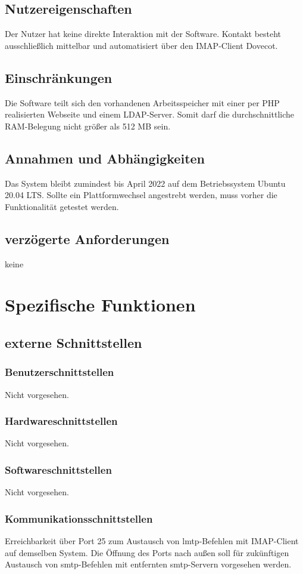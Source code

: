 \subsection{Nutzereigenschaften}
Der Nutzer hat keine direkte Interaktion mit der Software. Kontakt besteht ausschließlich mittelbar und automatisiert über den IMAP-Client Dovecot.
\subsection{Einschränkungen}
Die Software teilt sich den vorhandenen Arbeitsspeicher mit einer per PHP realisierten Webseite und einem LDAP-Server. Somit darf die durchschnittliche RAM-Belegung nicht größer als 512 MB sein.
\subsection{Annahmen und Abhängigkeiten}
Das System bleibt zumindest bis April 2022 auf dem Betriebssystem Ubuntu 20.04 LTS. Sollte ein Plattformwechsel angestrebt werden, muss vorher die Funktionalität getestet werden.
\subsection{verzögerte Anforderungen}
keine 
\section{Spezifische Funktionen}

\subsection{externe Schnittstellen}
\subsubsection*{Benutzerschnittstellen}
Nicht vorgesehen.
\subsubsection*{Hardwareschnittstellen}
Nicht vorgesehen.
\subsubsection*{Softwareschnittstellen}
Nicht vorgesehen.
\subsubsection*{Kommunikationsschnittstellen}
Erreichbarkeit über Port 25 zum Austausch von \ac{lmtp}-Befehlen mit IMAP-Client auf demselben System. Die Öffnung des Ports nach außen soll für zukünftigen Austausch von \ac{smtp}-Befehlen mit entfernten \ac{smtp}-Servern vorgesehen werden.
